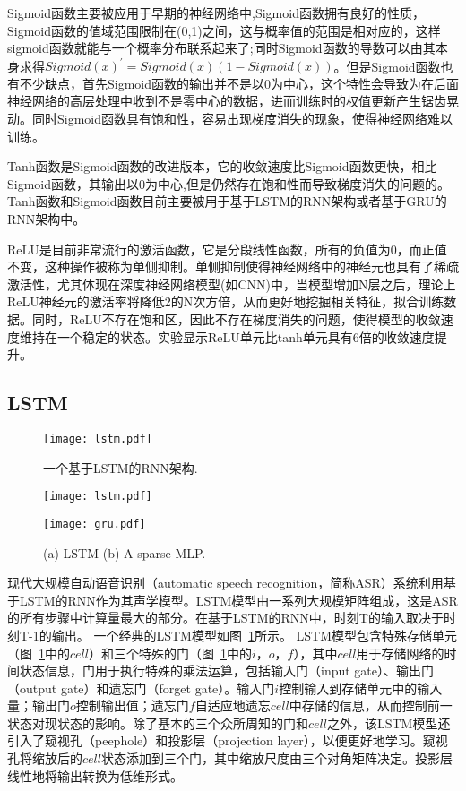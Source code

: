Sigmoid函数主要被应用于早期的神经网络中,Sigmoid函数拥有良好的性质，Sigmoid函数的值域范围限制在(0,1)之间，这与概率值的范围是相对应的，这样sigmoid函数就能与一个概率分布联系起来了;同时Sigmoid函数的导数可以由其本身求得$Sigmoid(x)^{'}=Sigmoid(x)(1-Sigmoid(x))$。但是Sigmoid函数也有不少缺点，首先Sigmoid函数的输出并不是以0为中心，这个特性会导致为在后面神经网络的高层处理中收到不是零中心的数据，进而训练时的权值更新产生锯齿晃动。同时Sigmoid函数具有饱和性，容易出现梯度消失的现象，使得神经网络难以训练。

Tanh函数是Sigmoid函数的改进版本，它的收敛速度比Sigmoid函数更快，相比Sigmoid函数，其输出以0为中心,但是仍然存在饱和性而导致梯度消失的问题的。Tanh函数和Sigmoid函数目前主要被用于基于LSTM的RNN架构或者基于GRU的RNN架构中。

ReLU是目前非常流行的激活函数，它是分段线性函数，所有的负值为0，而正值不变，这种操作被称为单侧抑制。单侧抑制使得神经网络中的神经元也具有了稀疏激活性，尤其体现在深度神经网络模型(如CNN)中，当模型增加N层之后，理论上ReLU神经元的激活率将降低2的N次方倍，从而更好地挖掘相关特征，拟合训练数据。同时，ReLU不存在饱和区，因此不存在梯度消失的问题，使得模型的收敛速度维持在一个稳定的状态。\cite{krizhevsky2012imagenet}实验显示ReLU单元比tanh单元具有6倍的收敛速度提升。

\subsection{LSTM}

\begin{figure}[b]
  \centering
  \texttt{[image: lstm.pdf]}
  \caption{\footnotesize 一个基于LSTM的RNN架构.}
  \label{fig:lstm}
\end{figure}

\begin{figure}[h]
\centering
\begin{minipage}[b]{0.45\columnwidth}
\texttt{[image: lstm.pdf]}
\end{minipage}
\hfill
\begin{minipage}[b]{0.45\columnwidth}
\texttt{[image: gru.pdf]}
\end{minipage}
\caption{\footnotesize (a) LSTM (b) A sparse MLP.}
\label{fig:RNN}
\end{figure}

现代大规模自动语音识别（automatic speech recognition，简称ASR）系统利用基于LSTM的RNN作为其声学模型。LSTM模型由一系列大规模矩阵组成，这是ASR的所有步骤中计算量最大的部分。在基于LSTM的RNN中，时刻T的输入取决于时刻T-1的输出。
一个经典的LSTM模型如图~\ref{fig:lstm}所示。
LSTM模型包含特殊存储单元（图~\ref{fig:lstm}中的$cell$）和三个特殊的门（图~\ref{fig:lstm}中的$i$，$o$，$f$），其中$cell$用于存储网络的时间状态信息，门用于执行特殊的乘法运算，包括输入门（input gate）、输出门（output gate）和遗忘门（forget gate）。输入门$i$控制输入到存储单元中的输入量；输出门$o$控制输出值；遗忘门$f$自适应地遗忘$cell$中存储的信息，从而控制前一状态对现状态的影响。除了基本的三个众所周知的门和$cell$之外，该LSTM模型还引入了窥视孔（peephole）和投影层（projection layer），以便更好地学习。窥视孔将缩放后的$cell$状态添加到三个门，其中缩放尺度由三个对角矩阵决定。投影层线性地将输出转换为低维形式。

